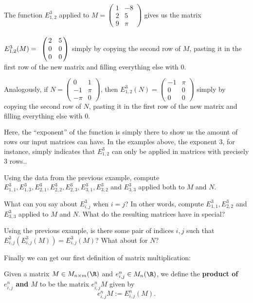 \begin{ex}
	The function $E^{3}_{1,2}$ applied to $M=\begin{pmatrix}
	1 & -8\\
	2 & 5\\
	9 & \pi
	\end{pmatrix}$ gives us the matrix \(E^3_{1,2}(M)=\bordermatrix{
	&&\cr
	& 2 & 5\cr
	& 0 &0\cr
	&0 &0
	}\) simply by copying the second row of $M$, pasting it in the first row of the new matrix and filling everything else with $0$.

	Analogously, if $N=\begin{pmatrix}
	0 & 1\\
	-1 & \pi\\
	-\pi & 0
	\end{pmatrix}$, then $E^3_{1,2}(N)=\begin{pmatrix}
	-1 & \pi\\
	0 & 0\\
	0 & 0
	\end{pmatrix}$ simply by copying the second row of $N$, pasting it in the first row of the new matrix and filling everything else with $0$.
\end{ex}

\begin{rmk}
	Here, the ``exponent'' of the function is simply there to show us the amount of rows our input matrices can have. In the examples above, the exponent $3$, for instance, simply indicates that $E^3_{1,2}$ can only be applied in matrices with precisely $3$ rows..
\end{rmk}
\begin{exerc}
	Using the data from the previous example, compute $E^3_{1,1}, E^3_{1,3}, E^3_{2,1}, E^3_{2,2}, E^3_{2,3},E^3_{3,1}, E^3_{3,2}$ and $E^3_{3,3}$ applied both to $M$ and $N$.
	
	What can you say about $E^3_{i,j}$ when $i=j$? In other words, compute $E^3_{1,1},E^3_{2,2}$ and $E^3_{3,3}$ applied to $M$ and $N$. What do the resulting matrices have in special?
\end{exerc}
\begin{exerc}
	Using the previous example, is there some pair of indices $i,j$ such that $E^3_{i,j}(E^3_{i,j}(M))=E^3_{i,j}(M)$? What about for $N$?
\end{exerc}

Finally we can get our first definition of matrix multiplication:

\begin{df}
	Given a matrix $M\in M_{n\times m}(\R)$ and $e^n_{i,j}\in M_n(\R)$, we define the \textbf{product of $e^n_{i,j}$ and $M$} to be the matrix $e^n_{i,j}M$ given by
	\[e^n_{i,j}M:=E^n_{i,j}(M).\]
\end{df}

